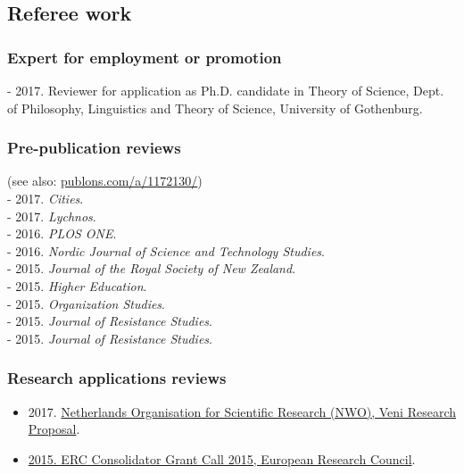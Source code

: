 \documentclass[a4paper,11pt,oneside]{article}
\begin{document}


\subsection{Referee work}

    \subsubsection{Expert for employment or promotion}
    - 2017. Reviewer for application as Ph.D. candidate in Theory of Science, Dept. of Philosophy, Linguistics and Theory of Science, University of Gothenburg.

    \subsubsection{Pre-publication reviews}
    (see also: \href{publons.com/a/1172130/}{publons.com/a/1172130/})\\
    - 2017. \emph{Cities}.\\
    - 2017. \emph{Lychnos}.\\
    - 2016. \emph{PLOS ONE}. \\
    - 2016. \emph{Nordic Journal of Science and Technology Studies}.\\
    - 2015. \emph{Journal of the Royal Society of New Zealand}. \\
    - 2015. \emph{Higher Education}.\\
    - 2015. \emph{Organization Studies}.\\
    - 2015. \emph{Journal of Resistance Studies}.\\
    - 2015. \emph{Journal of Resistance Studies}.

    \subsubsection{Research applications reviews}
    \begin{itemize}
      \item 2017. \href{http://files.christopherkullenberg.se/NWOreview.pdf}{Netherlands Organisation for Scientific Research (NWO), Veni Research Proposal}.
      \item \href{http://files.christopherkullenberg.se/erc.pdf}{2015. ERC Consolidator Grant Call 2015, European Research Council}.
    \end{itemize}
\end{document}
